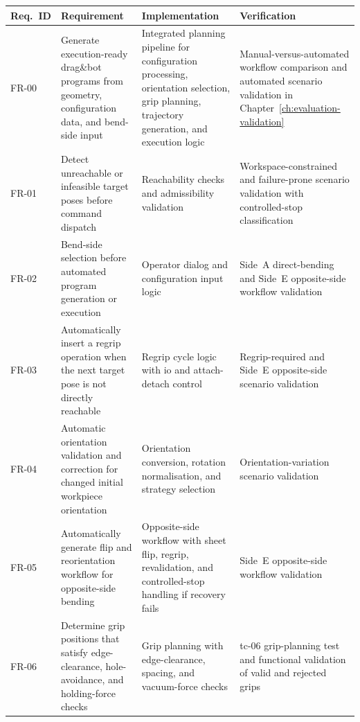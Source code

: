 ﻿\begin{landscape}

\begin{table}[p]
\centering
\normalsize
\setlength{\tabcolsep}{3pt}
\renewcommand{\arraystretch}{1.08}

\begin{tabular}{
L{1.8cm}
L{6.0cm}
L{9.0cm}
L{5.5cm}
}
\hline
\textbf{Req.\ ID} &
\textbf{Requirement} &
\textbf{Implementation} &
\textbf{Verification} \\
\hline

FR-00 &
Generate execution-ready drag\&bot programs from geometry, configuration data, and bend-side input &
Integrated planning pipeline for configuration processing, orientation selection, grip planning, trajectory generation, and execution logic &
Manual-versus-automated workflow comparison and automated scenario validation in Chapter~\ref{ch:evaluation-validation} \\
\hline

FR-01 &
Detect unreachable or infeasible target poses before command dispatch &
Reachability checks and admissibility validation &
Workspace-constrained and failure-prone scenario validation with controlled-stop classification \\
\hline

FR-02 &
Bend-side selection before automated program generation or execution &
Operator dialog and configuration input logic &
Side~A direct-bending and Side~E opposite-side workflow validation \\
\hline

FR-03 &
Automatically insert a regrip operation when the next target pose is not directly reachable &
Regrip cycle logic with \acs{io} and attach-detach control &
Regrip-required and Side~E opposite-side scenario validation \\
\hline

FR-04 &
Automatic orientation validation and correction for changed initial workpiece orientation &
Orientation conversion, rotation normalisation, and strategy selection &
Orientation-variation scenario validation \\
\hline

FR-05 &
Automatically generate flip and reorientation workflow for opposite-side bending &
Opposite-side workflow with sheet flip, regrip, revalidation, and controlled-stop handling if recovery fails &
Side~E opposite-side workflow validation \\
\hline

FR-06 &
Determine grip positions that satisfy edge-clearance, hole-avoidance, and holding-force checks &
Grip planning with edge-clearance, spacing, and vacuum-force checks &
\acs{tc}-06 grip-planning test and functional validation of valid and rejected grips \\
\hline


\end{tabular}
\end{table}
\end{landscape}
